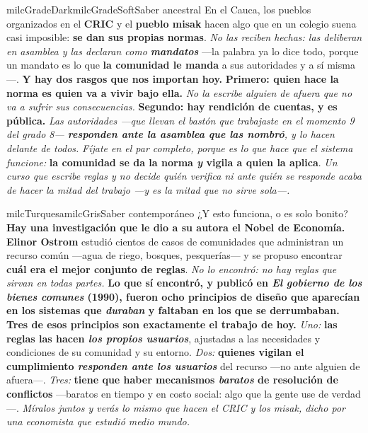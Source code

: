 \documentclass[11pt,letterpaper]{article}
\begin{document}
\begin{softbox}{milcGradeDark}{milcGradeSoft}{Saber ancestral}
En el Cauca, los pueblos organizados en el \textbf{CRIC} y el \textbf{pueblo misak} hacen algo que en un colegio suena casi imposible: \textbf{se dan sus propias normas}. \emph{No las reciben hechas: las deliberan en asamblea y las declaran como \textbf{mandatos}} ---la palabra ya lo dice todo, porque un mandato es lo que \textbf{la comunidad le manda} a sus autoridades y a sí misma---. \textbf{Y hay dos rasgos que nos importan hoy.} \textbf{Primero: quien hace la norma es quien va a vivir bajo ella.} \emph{No la escribe alguien de afuera que no va a sufrir sus consecuencias.} \textbf{Segundo: hay rendición de cuentas, y es pública.} \emph{Las autoridades ---que llevan el bastón que trabajaste en el momento 9 del grado 8--- \textbf{responden ante la asamblea que las nombró}, y lo hacen delante de todos.} \emph{Fíjate en el par completo, porque es lo que hace que el sistema funcione:} \textbf{la comunidad se da la norma \emph{y} vigila a quien la aplica}. \emph{Un curso que escribe reglas y no decide quién verifica ni ante quién se responde acaba de hacer la mitad del trabajo ---y es la mitad que no sirve sola---.}
\end{softbox}

\begin{softbox}{milcTurquesa}{milcGris}{Saber contemporáneo}
¿Y esto funciona, o es solo bonito? \textbf{Hay una investigación que le dio a su autora el Nobel de Economía.} \textbf{Elinor Ostrom} estudió cientos de casos de comunidades que administran un recurso común ---agua de riego, bosques, pesquerías--- y se propuso encontrar \textbf{cuál era el mejor conjunto de reglas}. \emph{No lo encontró: no hay reglas que sirvan en todas partes.} \textbf{Lo que sí encontró, y publicó en \emph{El gobierno de los bienes comunes} (1990), fueron \textbf{ocho principios de diseño} que aparecían en los sistemas que \emph{duraban} \textbf{y faltaban en los que se derrumbaban}.} \textbf{Tres de esos principios son exactamente el trabajo de hoy.} \emph{Uno:} \textbf{las reglas las hacen \emph{los propios usuarios}}, ajustadas a las necesidades y condiciones de su comunidad y su entorno. \emph{Dos:} \textbf{quienes vigilan el cumplimiento \emph{responden ante los usuarios}} del recurso ---no ante alguien de afuera---. \emph{Tres:} \textbf{tiene que haber mecanismos \emph{baratos} de resolución de conflictos} ---baratos en tiempo y en costo social: algo que la gente use de verdad---. \emph{Míralos juntos y verás lo mismo que hacen el CRIC y los misak, dicho por una economista que estudió medio mundo.}
\end{softbox}
\end{document}
